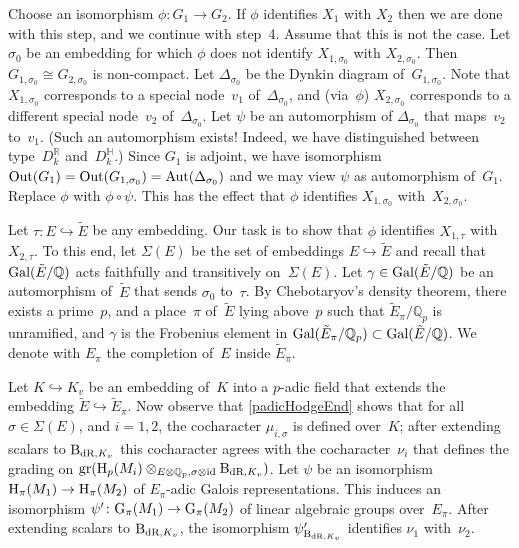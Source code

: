 \documentclass[10pt,twoside,leqno]{article}
\numberwithin{equation}{subsection}
\newcommand{\id}{\textnormal{id}}
\newcommand{\into}{\hookrightarrow}
\newcommand{\Aut}{\textnormal{Aut}}
\newcommand{\Out}{\textnormal{Out}}
\newcommand{\QQ}{\mathbb{Q}}
\newcommand{\QQp}{\QQ_{p}}
\newcommand{\RR}{\mathbb{R}}
\newcommand{\HQ}{\mathbb{H}}
\newcommand{\Gal}{\textnormal{Gal}}
\newcommand{\BdR}[1]{\textnormal{B}_{\dR,#1}}
\newcommand{\gr}{\textnormal{gr}}
\newcommand{\dR}{\textnormal{dR}}
\newcommand{\HH}{\textnormal{H}}
\newcommand{\Hp}{\HH_{p}}
\newcommand{\GG}{\textnormal{G}}
\begin{document}
Choose an isomorphism \(\phi \colon G_{1} \to G_{2}\).
If \(\phi\) identifies \(X_{1}\) with \(X_{2}\)
then we are done with this step, and we continue with step~4.
Assume that this is not the case.
Let \(\sigma_{0}\) be an embedding for which
\(\phi\) does not identify \(X_{1,\sigma_{0}}\) with \(X_{2,\sigma_{0}}\).
Then \(G_{1,\sigma_{0}} \cong G_{2,\sigma_{0}}\) is non-compact.
Let \(\Delta_{\sigma_{0}}\) be the Dynkin diagram of~\(G_{1,\sigma_{0}}\).
Note that \(X_{1,\sigma_{0}}\) corresponds
to a special node~$v_{1}$ of~\(\Delta_{\sigma_{0}}\),
and (via~\(\phi\)) \(X_{2,\sigma_{0}}\) corresponds
to a different special node~$v_{2}$ of~\(\Delta_{\sigma_{0}}\).
Let \(\psi\) be an automorphism of \(\Delta_{\sigma_{0}}\)
that maps~$v_{2}$ to~$v_{1}$.
(Such an automorphism exists!
Indeed, we have distinguished between type~\(D_{k}^{\RR}\) and~\(D_{k}^{\HQ}\).)
Since \(G_{1}\) is adjoint, we have isomorphism
\(\Out(G_{1}) = \Out(G_{1,\sigma_{0}}) = \Aut(\Delta_{\sigma_{0}})\)
and we may view \(\psi\) as automorphism of~\(G_{1}\).
Replace \(\phi\) with \(\phi \circ \psi\).
This has the effect that \(\phi\) identifies
\(X_{1,\sigma_{0}}\) with~\(X_{2,\sigma_{0}}\).

Let \(\tau \colon E \into \tilde{E}\) be any embedding.
Our task is to show that \(\phi\) identifies
\(X_{1,\tau}\) with~\(X_{2,\tau}\).
To this end, let \(\Sigma(E)\) be the set of embeddings \(E \into \tilde{E}\)
and recall that \(\Gal(\tilde{E}/\QQ)\)
acts faithfully and transitively on~\(\Sigma(E)\).
Let \(\gamma \in \Gal(\tilde{E}/\QQ)\) be an automorphism of~\(\tilde{E}\)
that sends \(\sigma_{0}\) to~\(\tau\).
By Chebotaryov's density theorem,
there exists a prime~\(p\),
and a place~\(\pi\) of~\(\tilde{E}\) lying above~\(p\)
such that
\(\tilde{E}_{\pi}/\QQp\) is unramified, and
\(\gamma\) is the Frobenius element in
\(\Gal(\tilde{E}_{\pi}/\QQp) \subset \Gal(\tilde{E}/\QQ)\).
We denote with \(E_{\pi}\) the completion of~\(E\) inside \(\tilde{E}_{\pi}\).

Let \(K \into K_{v}\) be an embedding of~\(K\) into a \(p\)-adic field
that extends the embedding \(\tilde{E} \into \tilde{E}_{\pi}\).
Now observe that \cref{padicHodgeEnd} shows that
for all \(\sigma \in \Sigma(E)\), and \(i = 1,2\),
the cocharacter \(\mu_{i,\sigma}\) is defined over~\(K\);
after extending scalars to \(\BdR{K_{v}}\)
this cocharacter agrees with the cocharacter~\(\nu_{i}\)
that defines the grading on
\(\gr(\Hp(M_{i}) \otimes_{E \otimes \QQp, \sigma \otimes \id} \BdR{K_{v}})\).
Let \(\psi\) be an isomorphism \(\HH_{\pi}(M_{1}) \to \HH_{\pi}(M_{2})\)
of \(E_{\pi}\)-adic Galois representations.
This induces an isomorphism
\(\psi' \colon \GG_{\pi}(M_{1}) \to \GG_{\pi}(M_{2})\)
of linear algebraic groups over~\(E_{\pi}\).
After extending scalars to \(\BdR{K_{v}}\),
the isomorphism \(\psi'_{\BdR{K_{v}}}\) identifies \(\nu_{1}\) with~\(\nu_{2}\).
\end{document}
